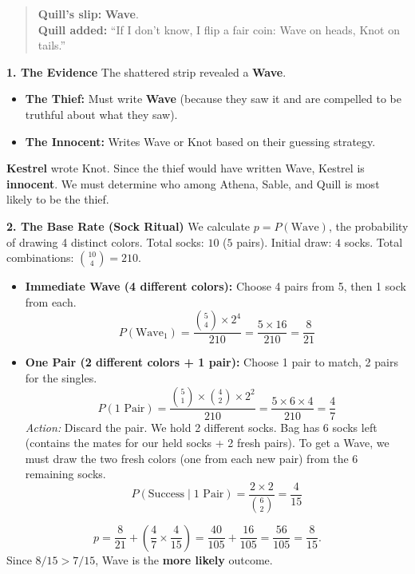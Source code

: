 \begin{quote}
\textbf{Quill's slip:} \textbf{Wave}. \\
\textbf{Quill added:} ``If I don't know, I flip a fair coin: Wave on heads, Knot on tails.''
\end{quote}



\SolutionPage

\textbf{1. The Evidence}
The shattered strip revealed a \textbf{Wave}.
\begin{itemize}
    \item \textbf{The Thief:} Must write \textbf{Wave} (because they saw it and are compelled to be truthful about what they saw).
    \item \textbf{The Innocent:} Writes Wave or Knot based on their guessing strategy.
\end{itemize}
\textbf{Kestrel} wrote Knot. Since the thief would have written Wave, Kestrel is \textbf{innocent}.
We must determine who among Athena, Sable, and Quill is most likely to be the thief.

\medskip

\textbf{2. The Base Rate (Sock Ritual)}
We calculate \(p = P(\text{Wave})\), the probability of drawing 4 distinct colors.
Total socks: \(10\) (\(5\) pairs). Initial draw: \(4\) socks. Total combinations: \(\binom{10}{4} = 210\).

\begin{itemize}
    \item \textbf{Immediate Wave (4 different colors):}
    Choose 4 pairs from 5, then 1 sock from each.
    \[ P(\text{Wave}_1) = \frac{\binom{5}{4} \times 2^4}{210} = \frac{5 \times 16}{210} = \frac{8}{21} \]
    \item \textbf{One Pair (2 different colors + 1 pair):}
    Choose 1 pair to match, 2 pairs for the singles.
    \[ P(\text{1 Pair}) = \frac{\binom{5}{1} \times \binom{4}{2} \times 2^2}{210} = \frac{5 \times 6 \times 4}{210} = \frac{4}{7} \]
    \textit{Action:} Discard the pair. We hold 2 different socks. Bag has 6 socks left (contains the mates for our held socks + 2 fresh pairs).
    To get a Wave, we must draw the two fresh colors (one from each new pair) from the 6 remaining socks.
    \[ P(\text{Success} \mid \text{1 Pair}) = \frac{2 \times 2}{\binom{6}{2}} = \frac{4}{15} \]
\end{itemize}
\[
p = \frac{8}{21} + \left( \frac{4}{7} \times \frac{4}{15} \right) = \frac{40}{105} + \frac{16}{105} = \frac{56}{105} = \frac{8}{15}.
\]
Since \(8/15 > 7/15\), Wave is the \textbf{more likely} outcome.

